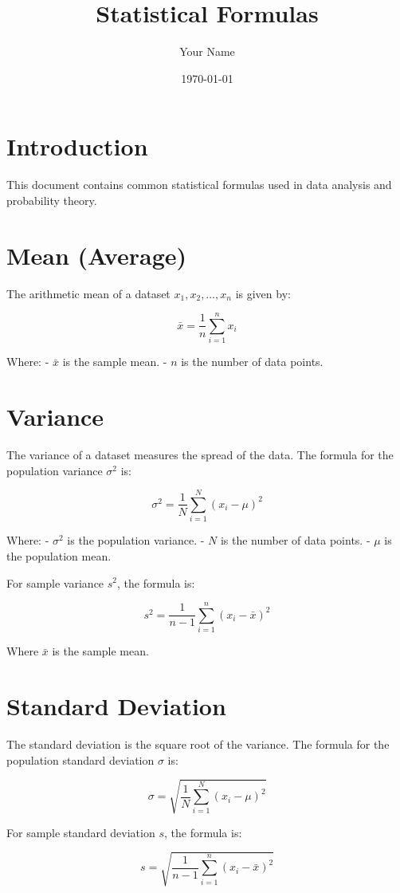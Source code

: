 \documentclass{article}
\begin{document}
\title{Statistical Formulas}
\author{Your Name}
\date{\today}
\maketitle

\section{Introduction}

This document contains common statistical formulas used in data analysis and probability theory.

\section{Mean (Average)}
The arithmetic mean of a dataset \(x_1, x_2, \dots, x_n\) is given by:

\[
\bar{x} = \frac{1}{n} \sum_{i=1}^{n} x_i
\]

Where:
- \( \bar{x} \) is the sample mean.
- \( n \) is the number of data points.

\section{Variance}
The variance of a dataset measures the spread of the data. The formula for the population variance \(\sigma^2\) is:

\[
\sigma^2 = \frac{1}{N} \sum_{i=1}^{N} (x_i - \mu)^2
\]

Where:
- \( \sigma^2 \) is the population variance.
- \( N \) is the number of data points.
- \( \mu \) is the population mean.

For sample variance \(s^2\), the formula is:

\[
s^2 = \frac{1}{n-1} \sum_{i=1}^{n} (x_i - \bar{x})^2
\]

Where \( \bar{x} \) is the sample mean.

\section{Standard Deviation}
The standard deviation is the square root of the variance. The formula for the population standard deviation \(\sigma\) is:

\[
\sigma = \sqrt{\frac{1}{N} \sum_{i=1}^{N} (x_i - \mu)^2}
\]

For sample standard deviation \(s\), the formula is:

\[
s = \sqrt{\frac{1}{n-1} \sum_{i=1}^{n} (x_i - \bar{x})^2}
\]
\end{document}
